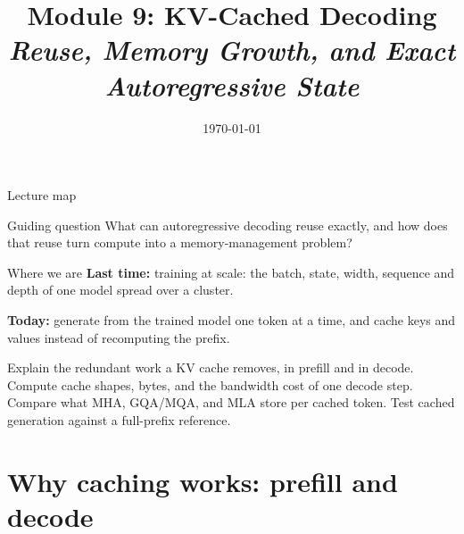 \documentclass[handout]{beamer}
\title[TASLLM -- Module 9]{Module 9: KV-Cached Decoding\\[4pt]
\normalsize\itshape Reuse, Memory Growth, and Exact Autoregressive State}
\date{\today}
\begin{document}
\makelecturetitle
\begin{frame}{Lecture map}
  \tableofcontents
  \vfill
  \begin{block}{Guiding question}
    What can autoregressive decoding reuse exactly, and how does that reuse turn compute into a memory-management problem?
  \end{block}
\end{frame}

\begin{frame}{Where we are}
  \vspace{10pt}
  \textbf{\textcolor{accentdark}{Last time:}} training at scale: the batch, state, width, sequence and depth of one model spread over a cluster.\par
  \vspace{10pt}
  \textbf{\textcolor{signaldark}{Today:}} generate from the trained model one token at a time, and cache keys and values instead of recomputing the prefix.
\end{frame}
\learninggoals
{Explain the redundant work a KV cache removes, in prefill and in decode.}
{Compute cache shapes, bytes, and the bandwidth cost of one decode step.}
{Compare what MHA, GQA/MQA, and MLA store per cached token.}
{Test cached generation against a full-prefix reference.}

\section{Why caching works: prefill and decode}
\end{document}
